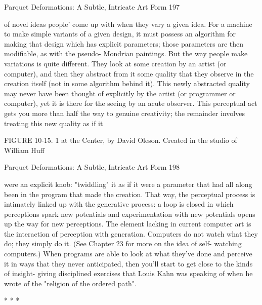 Parquet Deformations: A Subtle, Intricate Art Form                                       197

of novel ideas people' come up with when they vary a given idea. For a machine to make
simple variants of a given design, it must possess an algorithm for making that design
which has explicit parameters; those parameters are then modifiable, as with the pseudo-
Mondrian paintings. But the way people make variations is quite different. They look at
some creation by an artist (or computer), and then they abstract from it some quality that
they observe in the creation itself (not in some algorithm behind it). This newly
abstracted quality may never have been thought of explicitly by the artist (or programmer
or computer), yet it is there for the seeing by an acute observer. This perceptual act gets
you more than half the way to genuine creativity; the remainder involves treating this
new quality as if it

FIGURE 10-15. 1 at the Center, by David Oleson. Created in the studio of William Huff




Parquet Deformations: A Subtle, Intricate Art Form                                     198

were an explicit knob: "twiddling" it as if it were a parameter that had all along been in
the program that made the creation.
        That way, the perceptual process is intimately linked up with the generative
process: a loop is closed in which perceptions spark new potentials and experimentation
with new potentials opens up the way for new perceptions. The element lacking in
current computer art is the interaction of perception with generation. Computers do not
watch what they do; they simply do it. (See Chapter 23 for more on the idea of self-
watching computers.) When programs are able to look at what they've done and perceive
it in ways that they never anticipated, then you'll start to get close to the kinds of insight-
giving disciplined exercises that Louis Kahn was speaking of when he wrote of the
"religion of the ordered path".

                                          *   *   *

